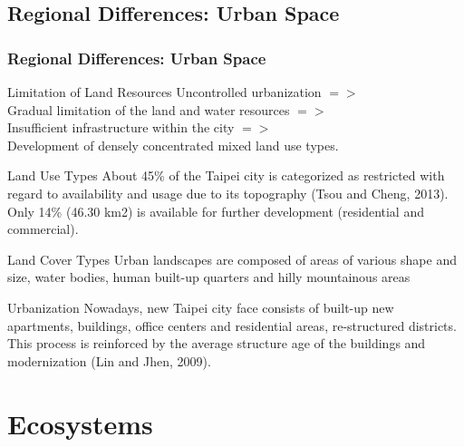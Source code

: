\documentclass[pdflatex,compress,8pt,
	xcolor={dvipsnames,dvipsnames,svgnames,x11names,table},
	hyperref={colorlinks = true,breaklinks = true, urlcolor = NavyBlue, breaklinks = true}]{beamer}
\begin{document}
\subsection{Regional Differences: Urban Space}
\begin{frame}\frametitle{Regional Differences: Urban Space}

\begin{alertblock}{Limitation of Land Resources}
Uncontrolled urbanization $=>$ \\
Gradual limitation of the land and water resources $=>$ \\
Insufficient infrastructure within the city $=>$ \\
Development of densely concentrated mixed land use types.
\end{alertblock}

\begin{block}{Land Use Types}
About 45\% of the Taipei city is categorized as restricted with regard to availability and usage due to its topography (Tsou and Cheng, 2013). \\
Only 14\% (46.30 km2) is available for further development (residential and commercial).
\end{block}

\begin{block}{Land Cover Types}
Urban landscapes are composed of areas of various shape and size, water bodies, human built-up quarters and hilly mountainous areas
\end{block}

\begin{examples}{Urbanization}
Nowadays, new Taipei city face consists of built-up new apartments, buildings, office centers and residential areas, re-structured districts. \\
This process is reinforced by the average structure age of the buildings and modernization (Lin and Jhen, 2009).
\end{examples}

\end{frame}

\section{Ecosystems}
\end{document}
